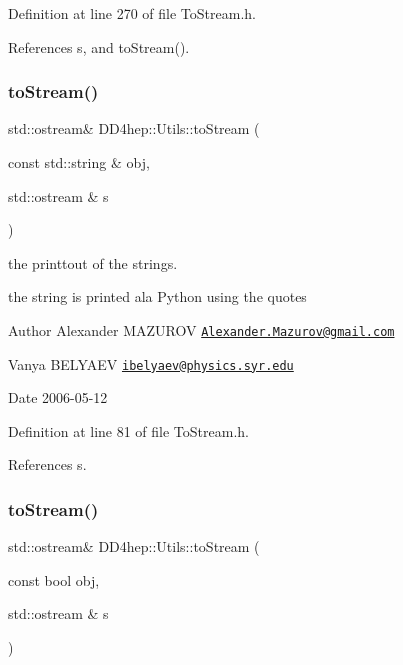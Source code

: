 Definition at line 270 of file To\+Stream.\+h.



References s, and to\+Stream().

\hypertarget{namespace_d_d4hep_1_1_utils_aa018a120e53fa6edbb44f423a31baa21}{}\label{namespace_d_d4hep_1_1_utils_aa018a120e53fa6edbb44f423a31baa21} 
\subsubsection{\texorpdfstring{to\+Stream()}{toStream()}\hspace{0.1cm}{\footnotesize\ttfamily [3/22]}}
{\footnotesize\ttfamily std\+::ostream\& D\+D4hep\+::\+Utils\+::to\+Stream (\begin{DoxyParamCaption}\item[{const std\+::string \&}]{obj,  }\item[{std\+::ostream \&}]{s }\end{DoxyParamCaption})\hspace{0.3cm}{\ttfamily [inline]}}



the printtout of the strings. 

the string is printed a\textquotesingle{}la Python using the quotes \begin{DoxyAuthor}{Author}
Alexander M\+A\+Z\+U\+R\+OV \href{mailto:Alexander.Mazurov@gmail.com}{\tt Alexander.\+Mazurov@gmail.\+com} 

Vanya B\+E\+L\+Y\+A\+EV \href{mailto:ibelyaev@physics.syr.edu}{\tt ibelyaev@physics.\+syr.\+edu} 
\end{DoxyAuthor}
\begin{DoxyDate}{Date}
2006-\/05-\/12 
\end{DoxyDate}


Definition at line 81 of file To\+Stream.\+h.



References s.

\hypertarget{namespace_d_d4hep_1_1_utils_a4f1e298302e413af8ba3059d36f85336}{}\label{namespace_d_d4hep_1_1_utils_a4f1e298302e413af8ba3059d36f85336} 
\subsubsection{\texorpdfstring{to\+Stream()}{toStream()}\hspace{0.1cm}{\footnotesize\ttfamily [4/22]}}
{\footnotesize\ttfamily std\+::ostream\& D\+D4hep\+::\+Utils\+::to\+Stream (\begin{DoxyParamCaption}\item[{const bool}]{obj,  }\item[{std\+::ostream \&}]{s }\end{DoxyParamCaption})\hspace{0.3cm}{\ttfamily [inline]}}



